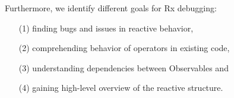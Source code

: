 Furthermore, we identify different goals for Rx debugging:
\begin{enumerate}
\itemsep0em 
\item[(1)] finding bugs and issues in reactive behavior,
\item[(2)] comprehending behavior of operators in existing code,
\item[(3)] understanding dependencies between Observables and
\item[(4)] gaining high-level overview of the reactive structure.
\end{enumerate}